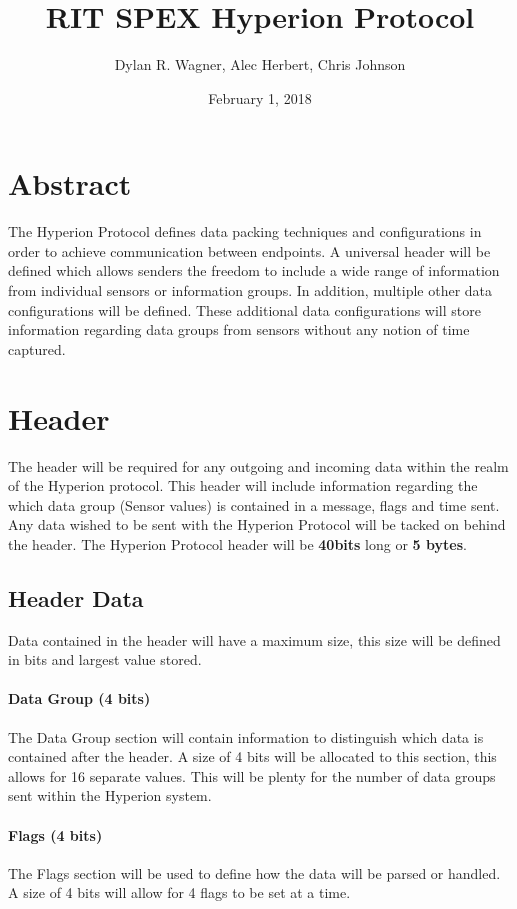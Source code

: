 \documentclass{article}
\title{RIT SPEX Hyperion Protocol}
\date{February 1, 2018}
\author{Dylan R. Wagner, Alec Herbert, Chris Johnson}
\begin{document}
  \maketitle
  
  \section{Abstract}
  The Hyperion Protocol defines data packing techniques and configurations in order to achieve communication between endpoints. A universal header will be defined which allows senders the freedom to include a wide range of information from individual sensors or information groups. In addition, multiple other data configurations will be defined. These additional data configurations will store information regarding data groups from sensors without any notion of time captured.
  
  \section{Header}
  The header will be required for any outgoing and incoming data within the realm of the Hyperion protocol. This header will include information regarding the which data group (Sensor values) is contained in a message, flags and time sent. Any data wished to be sent with the Hyperion Protocol will be tacked on behind the header.  The Hyperion Protocol header will be \textbf{40bits} long or \textbf{5 bytes}.
  \subsection{Header Data}
  Data contained in the header will have a maximum size, this size will be defined in bits and largest value stored. 
  
  \paragraph{Data Group (4 bits)}
  The Data Group section will contain information to distinguish which data is contained after the header. A size of 4 bits will be allocated to this section, this allows for 16 separate values. This will be plenty for the number of data groups sent within the Hyperion system. 
  
  \paragraph{Flags (4 bits)}
  The Flags section will be used to define how the data will be parsed or handled. A size of 4 bits will allow for 4 flags to be set at a time.
  
\end{document}
